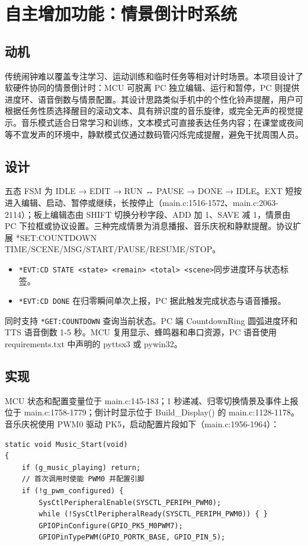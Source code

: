 \documentclass[11pt,a4paper]{article}
\begin{document}
\section{自主增加功能：情景倒计时系统}

\subsection{动机}

传统闹钟难以覆盖专注学习、运动训练和临时任务等相对计时场景。本项目设计了软硬件协同的情景倒计时：MCU 可脱离 PC 独立编辑、运行和暂停，PC 则提供进度环、语音倒数与情景配置。其设计思路类似手机中的个性化铃声提醒，用户可根据任务性质选择醒目的滚动文本、具有辨识度的音乐旋律，或完全无声的视觉提示。音乐模式适合日常学习和训练，文本模式可直接表达任务内容；在课堂或夜间等不宜发声的环境中，静默模式仅通过数码管闪烁完成提醒，避免干扰周围人员。

\subsection{设计}

五态 FSM 为 IDLE → EDIT → RUN ↔ PAUSE → DONE → IDLE。EXT 短按进入编辑、启动、暂停或继续，长按停止（main.c:1516-1572、main.c:2063-2114）；板上编辑态由 SHIFT 切换分秒字段、ADD 加 1、SAVE 减 1，情景由 PC 下拉框或协议设置。三种完成情景为消息播报、音乐庆祝和静默提醒。协议扩展 *SET:COUNTDOWN TIME/SCENE/MSG/START/PAUSE/RESUME/STOP。

\begin{itemize}
  \item \texttt{*EVT:CD STATE <state> <remain> <total> <scene>}同步进度环与状态标签。
  \item \texttt{*EVT:CD DONE} 在归零瞬间单次上报，PC 据此触发完成状态与语音播报。
\end{itemize}

同时支持 \texttt{*GET:COUNTDOWN} 查询当前状态。PC 端 CountdownRing 圆弧进度环和 TTS 语音倒数 1-5 秒。MCU 复用显示、蜂鸣器和串口资源，PC 语音使用 requirements.txt 中声明的 pyttsx3 或 pywin32。

\subsection{实现}

MCU 状态和配置变量位于 main.c:145-183；1 秒递减、归零切换情景及事件上报位于 main.c:1758-1779；倒计时显示位于 Build\_Display() 的 main.c:1128-1178。音乐庆祝使用 PWM0 驱动 PK5，启动配置片段如下（main.c:1956-1964）：
\begin{lstlisting}[style=cstyle]
static void Music_Start(void)
{
    if (g_music_playing) return;
    // 首次调用时使能 PWM0 并配置引脚
    if (!g_pwm_configured) {
        SysCtlPeripheralEnable(SYSCTL_PERIPH_PWM0);
        while (!SysCtlPeripheralReady(SYSCTL_PERIPH_PWM0)) { }
        GPIOPinConfigure(GPIO_PK5_M0PWM7);
        GPIOPinTypePWM(GPIO_PORTK_BASE, GPIO_PIN_5);
\end{lstlisting}
\end{document}
